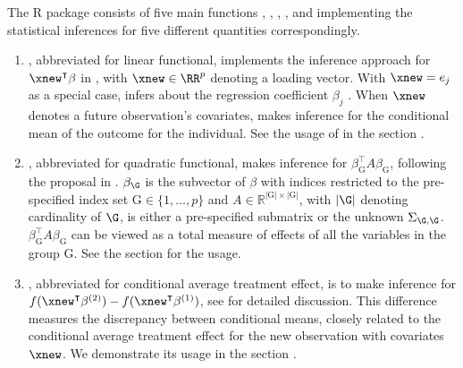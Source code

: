 The R package  consists of five main functions , , , , and  implementing the statistical inferences for five different quantities correspondingly. %
\begin{enumerate}
    \item {}, abbreviated for linear functional, implements the inference approach for $\xnew^\intercal \beta$ in \citet{cai2021optimal, cai2021statistical}, with $\xnew \in \RR^p$ denoting a loading vector.
    With $\xnew = e_j$ as a special case,  infers about the regression coefficient $\beta_j$ \citep[e.g.]{van2014asymptotically, javanmard2014confidence, zhang2014confidence}. When $\xnew$ denotes a future observation's covariates,  makes inference for the conditional mean of the outcome for the individual. See the usage of  in the section . 
    
    \item {}, abbreviated for quadratic functional, makes inference for $\beta_{\mathrm{G}}^{\intercal} A \beta_{\mathrm{G}}$, following the proposal in \citet{guo2019optimal, guo2021group, cai2020semisupervised}. $\beta_\G$ is the subvector of $\beta$ with indices restricted to the pre-specified index set $\textrm{G} \in \{1,\ldots,p\}$ and $A\in \mathbb{R}^{|\mathrm{G}|\times |\mathrm{G}|}$, with $|\G|$ denoting cardinality of $\G$, is either a pre-specified submatrix or the unknown $\Sigma_{\G,\G}$.  $ \beta_{\mathrm{G}}^{\intercal} A \beta_{\mathrm{G}}$ can be viewed as a total measure of effects of all the variables in the group $\mathrm{G}$. See the section  for the usage. %

    \item {}, abbreviated for conditional average treatment effect, is to make inference for $f(\xnew^\intercal \beta^{(2)}) - f(\xnew^\intercal \beta^{(1)})$, see \cite{cai2021optimal} for detailed discussion. This difference measures the discrepancy between conditional means, closely related to the conditional average treatment effect for the new observation with covariates $\xnew$. We demonstrate its usage in the section . %


\end{enumerate}
